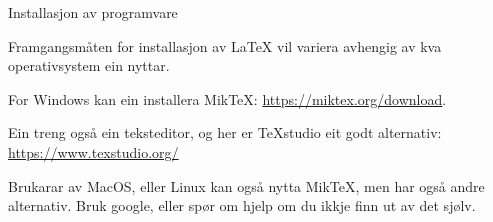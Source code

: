 \begin{frame}{Installasjon av programvare}
	
	Framgangsmåten for installasjon av \LaTeX{} vil variera avhengig av kva operativsystem ein nyttar.
	
	For Windows kan ein installera MikTeX: \url{https://miktex.org/download}.
	
	Ein treng også ein teksteditor, og her er TeXstudio eit godt alternativ: \url{https://www.texstudio.org/}
	
	Brukarar av MacOS, eller Linux kan også nytta MikTeX, men har også andre alternativ. Bruk google, eller spør om hjelp om du ikkje finn ut av det sjølv.
\end{frame}


